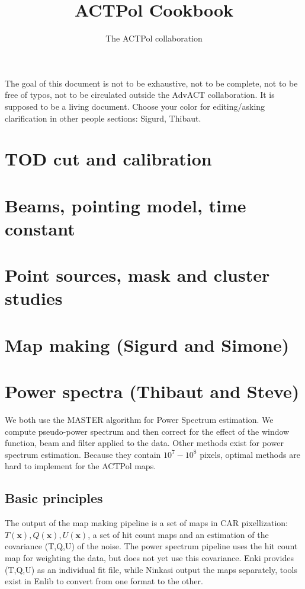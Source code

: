 \documentclass[a4paper, 11pt]{article}
\newcommand{\skn}[1]{{\color{red}#1}}
\newcommand{\TIB}[1]{{\color{blue}#1}}
\begin{document}
\title{\textbf{ACTPol Cookbook}}
\author{The ACTPol collaboration}
\maketitle

The goal of this document is not to be exhaustive, not to be complete, not
to be free of typos, not to be circulated outside the AdvACT collaboration.
It is supposed to be a living document.  Choose your color for
editing/asking clarification in other people sections: \skn{Sigurd}, \TIB{Thibaut}.

\section{TOD cut and calibration}

\section{Beams, pointing model, time constant}

\section{Point sources, mask and cluster studies}


\section{Map making (Sigurd and Simone)}

\section{Power spectra (Thibaut and Steve)}

We both use the MASTER algorithm for Power Spectrum estimation. We compute pseudo-power spectrum and then correct for the effect of the window function, beam and filter applied to the data. Other methods exist for power spectrum estimation. Because they contain $10^{7}-10^{8}$ pixels, optimal methods are hard to implement for the ACTPol maps.

\subsection{Basic principles}\label{subsec:PSbasis}

The output of the map making pipeline is a set of maps in CAR pixellization: $T(\bm{x}), Q(\bm{x}), U(\bm{x})$, a set of hit count maps and an estimation of the covariance (T,Q,U) of the noise. The power spectrum pipeline uses the hit count map for weighting the data, but  does not yet use this covariance.
Enki provides (T,Q,U) as an individual fit file, while Ninkasi output the maps separately, tools exist in Enlib to convert from one format to the other. 
\end{document}
